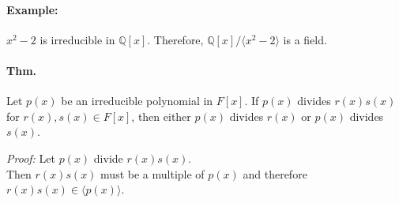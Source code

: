 \documentclass[10pt,a4paper]{article}
\begin{document}
\paragraph{Example:} $x^2-2$ is irreducible in $\mathbb{Q}[x]$. Therefore, $\mathbb{Q}[x]/\langle x^2 -2 \rangle$ is a field.

\paragraph{Thm.} Let $p(x)$ be an irreducible polynomial in $F[x]$. If $p(x)$ divides $r(x)s(x)$ for $r(x),s(x) \in F[x]$, then either $p(x)$ divides $r(x)$ or $p(x)$ divides $s(x)$.

\begin{flushleft}
\textit{Proof:} Let $p(x)$ divide $r(x)s(x)$.\\
Then $r(x)s(x)$ must be a multiple of $p(x)$ and therefore $r(x)s(x) \in \langle p(x) \rangle$.\\

\end{flushleft} 
\end{document}

